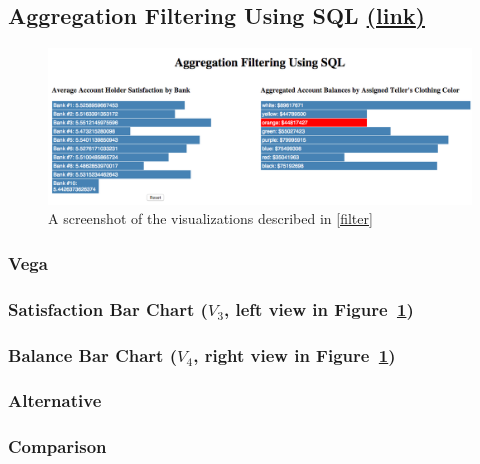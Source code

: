 \documentclass[fleqn]{sigplanconf}
\begin{document}
\subsection{Aggregation Filtering Using SQL \href{http://randy.cs.columbia.edu/lineage/pgbench-filter/pgbench.html}{(\underline{link})}}\label{filter}
\begin{figure}[H]
	\includegraphics[width=\columnwidth]{figures/filter}
	\caption{A screenshot of the visualizations described in \autoref{filter}
	}
	\label{fig_filter}
\end{figure}
\subsubsection{Vega}
\subsubsection*{Satisfaction Bar Chart ($V_3$, left view in Figure~\ref{fig_filter})}

\subsubsection*{Balance Bar Chart ($V_4$, right view in Figure~\ref{fig_filter})}

\subsubsection{Alternative}
\subsubsection{Comparison}



\end{document}
